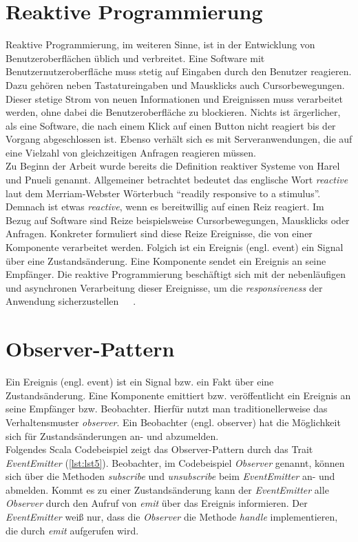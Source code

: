 \pagebreak

\section{Reaktive Programmierung}
Reaktive Programmierung, im weiteren Sinne, ist in der Entwicklung von Benutzeroberflächen üblich und verbreitet. Eine Software mit Benutzernutzeroberfläche muss stetig auf Eingaben durch den Benutzer reagieren. Dazu gehören neben Tastatureingaben und Mausklicks auch Cursorbewegungen. Dieser stetige Strom von neuen Informationen und Ereignissen muss verarbeitet werden, ohne dabei die Benutzeroberfläche zu blockieren. Nichts ist ärgerlicher, als eine Software, die nach einem Klick auf einen Button nicht reagiert bis der Vorgang abgeschlossen ist. Ebenso verhält sich es mit Serveranwendungen, die auf eine Vielzahl von gleichzeitigen Anfragen reagieren müssen.\\
Zu Beginn der Arbeit wurde bereits die Definition reaktiver Systeme von Harel und Pnueli genannt. Allgemeiner betrachtet bedeutet das englische Wort \textit{reactive} laut dem Merriam-Webster Wörterbuch \enquote{readily responsive to a stimulus}. Demnach ist etwas \textit{reactive}, wenn es bereitwillig auf einen Reiz reagiert. Im Bezug auf Software sind Reize beispielsweise Cursorbewegungen, Mausklicks oder Anfragen. Konkreter formuliert sind diese Reize Ereignisse, die von einer Komponente verarbeitet werden. Folgich ist ein Ereignis (engl. event) ein Signal über eine Zustandsänderung. Eine Komponente sendet ein Ereignis an seine Empfänger. Die reaktive Programmierung beschäftigt sich mit der nebenläufigen und asynchronen Verarbeitung dieser Ereignisse, um die \textit{responsiveness} der Anwendung sicherzustellen~\cite{rappl_introduction_2016}~\cite[S.~4]{carkci_dataflow_2014}~\cite[S.~5]{blackheath_functional_2015}.

\section{Observer-Pattern}
Ein Ereignis (engl. event) ist ein Signal bzw. ein Fakt über eine Zustandsänderung. Eine Komponente emittiert bzw. veröffentlicht ein Ereignis an seine Empfänger bzw. Beobachter. Hierfür nutzt man traditionellerweise das Verhaltensmuster \textit{observer}. Ein Beobachter (engl. observer) hat die Möglichkeit sich für Zustandsänderungen an- und abzumelden.\\
Folgendes Scala Codebeispiel zeigt das Observer-Pattern durch das Trait \textit{EventEmitter} (\ref{lst:lst5}). Beobachter, im Codebeispiel \textit{Observer} genannt, können sich über die Methoden \textit{subscribe} und \textit{unsubscribe} beim \textit{EventEmitter} an- und abmelden. Kommt es zu einer Zustandsänderung kann der \textit{EventEmitter} alle \textit{Observer} durch den Aufruf von \textit{emit} über das Ereignis informieren. Der \textit{EventEmitter} weiß nur, dass die \textit{Observer} die Methode \textit{handle} implementieren, die durch \textit{emit} aufgerufen wird.

